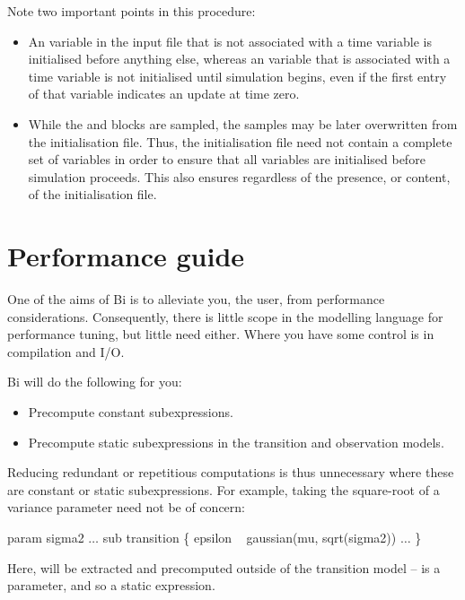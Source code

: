 Note two important points in this procedure:
\begin{itemize}
\item An  variable in the input file that is not associated with a
  time variable is initialised before anything else, whereas an 
  variable that is associated with a time variable is not initialised until
  simulation begins, even if the first entry of that variable indicates an
  update at time zero.
\item While the  and  blocks are
  sampled, the samples may be later overwritten from the initialisation
  file. Thus, the initialisation file need not contain a complete set of
  variables in order to ensure that all variables are initialised before
  simulation proceeds. This also ensures
  regardless of the presence, or content, of the initialisation file.
\end{itemize}

\section{Performance guide\label{Performance guide}}

One of the aims of Bi is to alleviate you, the user, from performance
considerations. Consequently, there is little scope in the modelling language
for performance tuning, but little need either. Where you have some control is
in compilation and I/O.

Bi will do the following for you:
\begin{itemize}
\item Precompute constant subexpressions.
\item Precompute static subexpressions in the transition and observation
  models.
\end{itemize}

Reducing redundant or repetitious computations is thus unnecessary where these
are constant or static subexpressions. For example, taking the square-root of
a variance parameter need not be of concern:
\begin{bicode}
param sigma2
\(\ldots\)
sub transition \{
    epsilon ~ gaussian(mu, sqrt(sigma2))
    \(\ldots\)
\}
\end{bicode}
Here,  will be extracted and precomputed outside of the
transition model --  is a parameter, and so
 a static expression.

